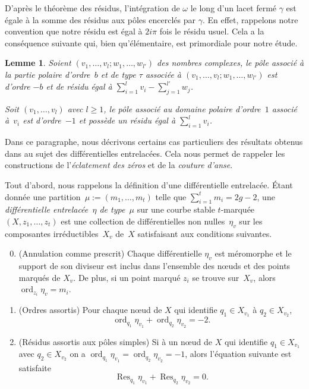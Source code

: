 \documentclass[JEP,XML,SOM,Unicode,francais,NoFloatCountersInSection,published]{cedram}
\DeclareMathOperator{\ord}{ord}
\newcommand\Res{\operatorname{Res}}
\newtheorem{lem}[thm]{Lemme}
\theoremstyle{definition}
\begin{document}
\par
D'après le théorème des résidus, l'intégration de $\omega$ le long d'un lacet fermé $\gamma$ est égale à la somme des résidus aux pôles encerclés par $\gamma$. En effet, rappelons notre convention que notre résidu est égal à $2i\pi$ fois le résidu usuel.
Cela a la conséquence suivante qui, bien qu'élémentaire, est primordiale pour notre étude.
\begin{lem}\label{lm:residu}
Soient $(v_{1},\dots,v_{l};w_{1},\dots,w_{l'})$ des nombres complexes, le pôle associé à la partie polaire d'ordre~$b$ et de type $\tau$ associée à $(v_{1},\dots,v_{l};w_{1},\dots,w_{l'})$ est d'ordre $-b$ et de résidu égal à $\sum_{i=1}^{l} v_{i}-\sum_{j=1}^{l'} w_{j}$.

Soit $(v_{1},\dots,v_{l})$ avec $l\geq1$, le pôle associé au domaine polaire d'ordre~$1$ associé à~$v_{i}$ est d'ordre~$-1$ et possède un résidu égal à $\sum_{i=1}^{l} v_{i}$.
\end{lem}

\label{sec:pluridiffentre}

Dans ce paragraphe, nous décrivons certains cas particuliers des résultats obtenus dans \cite{BCGGM} au sujet des différentielles entrelacées. Cela nous permet de rappeler les constructions de l'\emph{éclatement des zéros} et de la \emph{couture d'anse}.

Tout d'abord, nous rappelons la définition d'une différentielle entrelacée.
Étant donnée une partition~$\mu:=(m_{1},\dots,m_{t})$ telle que $\sum_{i=1}^t m_i = 2g-2$, une \emph{différentielle entrelacée~$\eta$ de type~$\mu$}
sur une courbe stable $t$-marquée $(X,z_1,\ldots,z_t)$
est une collection de
différentielles non nulles~$\eta_v$ sur les composantes irréductibles~$X_v$ de~$X$ satisfaisant aux conditions suivantes.
\begin{enumerate}\setcounter{enumi}{-1}
\item
(Annulation comme prescrit) Chaque différentielle $\eta_v$ est méromorphe et le support de son diviseur est inclus dans l'ensemble des nœuds et des points marqués de $X_v$. De plus, si un point marqué $z_i$ se trouve sur~$X_v$, alors $\ord_{z_i} \eta_v=m_i$.
\item
(Ordres assortis) Pour chaque nœud de $X$ qui identifie $q_1 \in X_{v_1}$ à $q_2 \in X_{v_2}$,\vspace*{-3pt}
\[
\ord_{q_1} \eta_{v_1}+\ord_{q_2} \eta_{v_2} = -2. \]
\item
(Résidus assortis aux pôles simples) Si à un nœud de $X$
qui identifie $q_1 \in X_{v_1}$ avec $q_2 \in X_{v_2}$ on a $\ord_{q_1}\eta_{v_1}=
\ord_{q_2} \eta_{v_2}=-1$, alors l'équation suivante est satisfaite\vspace*{-3pt}
\[
\Res_{q_1}\eta_{v_1} + \Res_{q_2}\eta_{v_2} = 0 .
\]
\end{enumerate}
\end{document}
